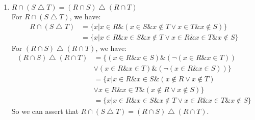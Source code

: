 \documentclass[12pt]{article}
\theoremstyle{neosn}
\begin{document}
\begin{enumerate}
        \item $R\cap (S \bigtriangleup T) = (R \cap S) \bigtriangleup (R \cap T)$\\
            For $R\cap (S \bigtriangleup T)$, we have:
            \begin{align*}
                R\cap (S \bigtriangleup T) &= \{x|x\in R \& (x\in S \& x\notin T \lor x\in T \& x\notin S)\}\\
                    &= \{x|x\in R \& x\in S \& x\notin T \lor x\in R \& x\in T \& x\notin S\}
            \end{align*}
            For $(R \cap S) \bigtriangleup (R \cap T)$, we have:
            \begin{align*}
                (R \cap S) \bigtriangleup (R \cap T) &= \{(x\in R \& x\in S) \& (\lnot (x\in R \& x\in T))\\
                        &\lor (x\in R \& x\in T) \& (\lnot (x\in R \& x\in S))\}\\
                        &= \{x|x\in R \& x\in S \& (x\notin R \lor x\notin T) \\
                        &\lor x\in R \& x\in T \& (x\notin R \lor x\notin S)\}\\
                        &= \{x|x\in R \& x\in S \& x\notin T \lor x\in R \& x\in T \& x\notin S\}
            \end{align*}
            So we can assert that $R\cap (S \bigtriangleup T) = (R \cap S) \bigtriangleup (R \cap T)$.
    \end{enumerate}
\end{document}
